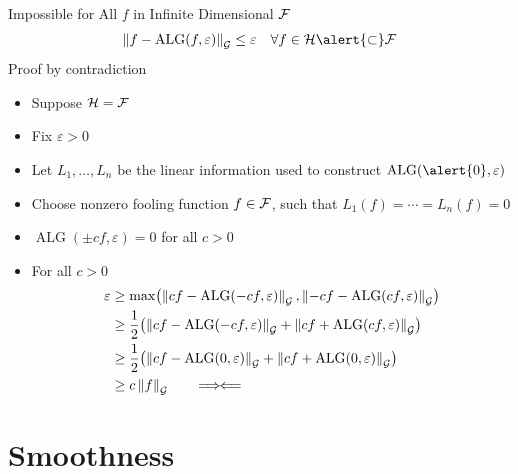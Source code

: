 \documentclass[10pt,compress,xcolor={usenames,dvipsnames},aspectratio=169]{beamer}
\newcommand{\contradiction}{%
  \ensuremath{{\Longrightarrow\mspace{-2mu}\Longleftarrow}}%
}
\DeclareMathOperator{\alg}{ALG}
\begin{document}
\begin{frame}{Impossible for All $f$ in Infinite Dimensional $\mathcal{F}$}
\vspace{-5ex}
\[
\norm[\cg]{f - \alg(f,\varepsilon)} \le \varepsilon \quad \forall f \in \ch \alert{\subset} \cf
\]
\alert{Proof by contradiction}

\vspace{-3ex}
\begin{itemize}
    \item Suppose $\mathcal{H} = \mathcal{F}$
    
    \item Fix $\varepsilon > 0$
    
    \item Let $L_1, \ldots, L_n$ be the linear information used to construct $\alg(\alert{0},\varepsilon)$
    
    \item Choose \alert{nonzero fooling function} $f \in \mathcal{F}$, such that $L_1(f) = \cdots = L_n(f) = 0$
    
    \item $\alg(\pm cf,\varepsilon) = 0$ for all $c > 0$
    
    \item For all $c > 0$
    \begin{align*}
        \varepsilon & \ge \max\bigl(\norm[\cg]{cf - \alg(-cf,\varepsilon)}, \norm[\cg]{-cf - \alg(cf,\varepsilon)} \bigr) \\
        & \ge \frac 12 \bigl(\norm[\cg]{cf - \alg(-cf,\varepsilon)} + \norm[\cg]{cf + \alg(cf,\varepsilon)} \bigr) \\
        & \ge \frac 12 \bigl(\norm[\cg]{cf - \alg(0,\varepsilon)} + \norm[\cg]{cf + \alg(0,\varepsilon)} \bigr) \\
        & \ge  c \norm[\cg]{f} \qquad \contradiction
    \end{align*}
    
\end{itemize}

\end{frame}

\section{Smoothness}
\end{document}
